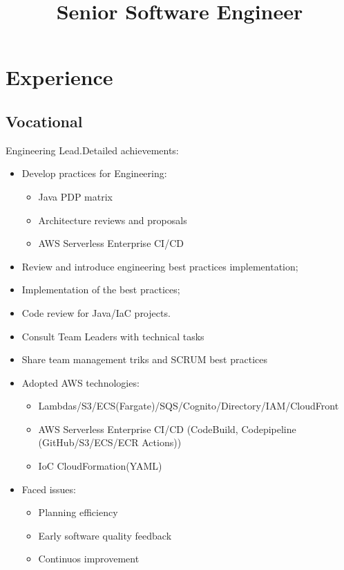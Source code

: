 \documentclass[11pt, a4paper]{moderncv}
\title{Senior Software Engineer}
\begin{document}
\makecvtitle

\section{Experience}
\subsection{Vocational}
{Engineering Lead.\newline{}Detailed achievements:
\begin{itemize}
\item Develop practices for Engineering:
\begin{itemize}
\item Java PDP matrix
\item Architecture reviews and proposals
\item AWS Serverless Enterprise CI/CD
\end{itemize}
\item Review and introduce engineering best practices implementation;
\item Implementation of the best practices;
\item Code review for Java/IaC projects.
\item Consult Team Leaders with technical tasks
\item Share team management triks and SCRUM best practices
\item Adopted AWS technologies:
\begin{itemize}
\item Lambdas/S3/ECS(Fargate)/SQS/Cognito/Directory/IAM/CloudFront
\item AWS Serverless Enterprise CI/CD (CodeBuild, Codepipeline (GitHub/S3/ECS/ECR Actions))
\item IoC CloudFormation(YAML)
\end{itemize}
\item Faced issues:
\begin{itemize}
\item Planning efficiency
\item Early software quality feedback
\item Continuos improvement
\end{itemize}
\end{itemize}}
\end{document}
